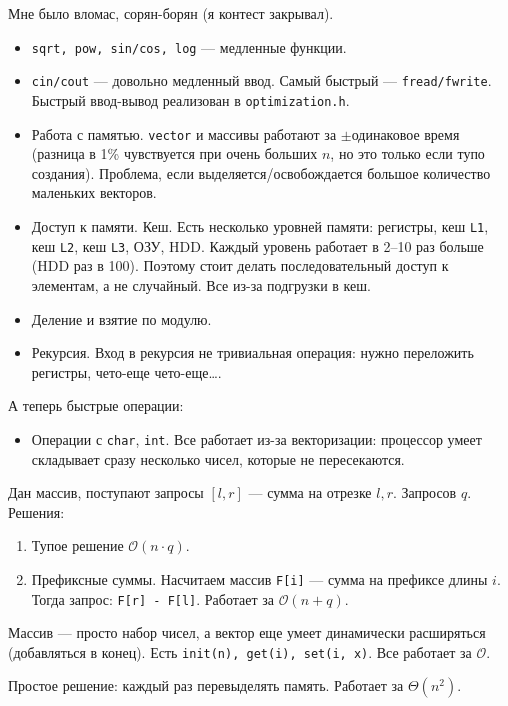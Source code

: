\lstset{language=c++}
Мне было вломас, сорян-борян (я контест закрывал).
\begin{itemize}
    \item \texttt{sqrt, pow, sin/cos, log} --- медленные функции.
    \item \texttt{cin/cout} --- довольно медленный ввод. Самый быстрый --- \texttt{fread/fwrite}. Быстрый ввод-вывод реализован в \texttt{optimization.h}. 
    \item Работа с памятью. \texttt{vector} и массивы работают за $\pm$одинаковое время (разница в 1\% чувствуется при очень больших $n$, но это только если тупо создания). Проблема, если выделяется/освобождается большое количество маленьких векторов.
    \item Доступ к памяти. Кеш. Есть несколько уровней памяти: регистры, кеш \texttt{L1}, кеш \texttt{L2}, кеш \texttt{L3}, ОЗУ, HDD. Каждый уровень работает в 2--10 раз больше (HDD раз в 100). Поэтому стоит делать последовательный доступ к элементам, а не случайный. Все из-за подгрузки в кеш. 
    \item Деление и взятие по модулю. 
    \item Рекурсия. Вход в рекурсия не тривиальная операция: нужно переложить регистры, чето-еще  чето-еще\ldots.
\end{itemize}
А теперь быстрые операции:
\begin{itemize}
    \item Операции с \texttt{char}, \texttt{int}. Все работает из-за векторизации: процессор умеет складывает сразу несколько чисел, которые не пересекаются. 
\end{itemize}
Дан массив, поступают запросы $\left[l, r\right]$ --- сумма на отрезке  $l, r$. Запросов  $q$.
Решения:
\begin{enumerate}
    \item Тупое решение $\mathcal{O}(n \cdot q)$.
    \item Префиксные суммы. Насчитаем массив \texttt{F[i]} --- сумма на префиксе длины $i$. Тогда запрос:  \texttt{F[r] - F[l]}. Работает за $\mathcal{O}(n + q)$.
\end{enumerate}
Массив --- просто набор чисел, а вектор еще умеет динамически расширяться (добавляться в конец). Есть \texttt{init(n), get(i), set(i, x)}. Все работает за  $\mathcal{O}$.

Простое решение: каждый раз перевыделять память. Работает за $\Theta(n^2)$.

